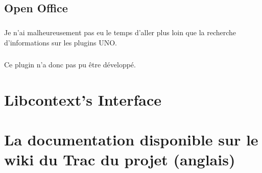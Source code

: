 	\section{Open Office}
		\paragraph*{}
			Je n'ai malheureusement pas eu le temps d'aller plus loin que la recherche d'informations sur les plugins UNO.
			
		\paragraph*{}
			Ce plugin n'a donc pas pu être développé.
	
\chapter{Libcontext's Interface}
	\label{PIGA_SYSTRANS Libcontext Interface}
	
	
\chapter{La documentation disponible sur le wiki du Trac du projet (anglais)}
	\label{PIGA_SYSTRANS TRAC}
